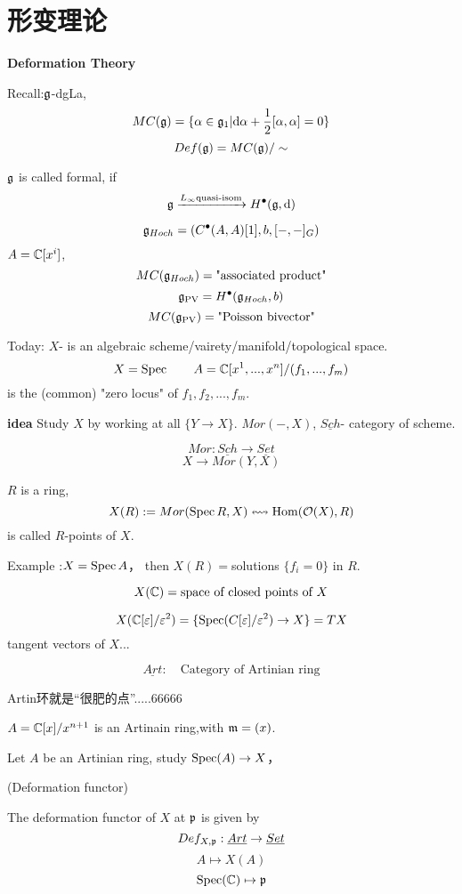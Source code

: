 \section{形变理论}
\textbf{Deformation Theory}

Recall:$\mathfrak{g}$-dgLa,
$$MC(\mathfrak{g})=\{\alpha\in\mathfrak{g}_1|\mathrm{d}\alpha+\frac{1}{2}[\alpha,\alpha]=0\}$$
$$Def(\mathfrak{g})=MC(\mathfrak{g})/\sim$$

$\mathfrak{g}$ is called formal, if 
$$\mathfrak{g}\xrightarrow{L_{\infty}\text{quasi-isom}}H^{\bullet}(\mathfrak{g},\mathrm{d})$$

$$\mathfrak{g}_{Hoch}=(C^{\bullet}(A,A)[1],b,[-,-]_G)$$
$A=\mathbb{C}[x^i]$,
$$MC(\mathfrak{g}_{Hoch})=\text{"associated product"}$$
$$\mathfrak{g}_{\operatorname{PV}}=H^{\bullet}(\mathfrak{g}_{Hoch},b)$$
$$MC(\mathfrak{g}_{\operatorname{PV}})=\text{"Poisson bivector"}$$

Today:
$X$- is an algebraic scheme/vairety/manifold/topological space.
$$X=\operatorname{Spec}\qquad A=\mathbb{C}[x^1,...,x^n]/(f_1,...,f_m)$$
is the (common) "zero locus" of $f_1,f_2,...,f_m$.

\textbf{idea} Study $X$ by working at all $\{Y\to X\}$.
$Mor(-,X)$, $\underline{Sch}$- category of scheme.

$$Mor: \underline{Sch}\to\underline{Set}$$
$$X\to Mor(Y,X)$$

\begin{notation}
$R$ is a ring, 
$$X(R):=Mor(\operatorname{Spec} R,X)\leftrightsquigarrow\operatorname{Hom}(\mathcal{O}(X),R)$$
is called $R$-points of $X$.
\end{notation}

Example :$X=\operatorname{Spec} A$， then $X(R)=$solutions $\{f_i=0\}$ in $R$.

\begin{example}
$$X(\mathbb{C})=\text{space of closed points of $X$}$$

$$X(\mathbb{C}[\varepsilon]/\varepsilon^2)=
\{\operatorname{Spec}(C[\varepsilon]/\varepsilon^2)\to X\}
=TX$$
tangent vectors of $X$...
\end{example}

\begin{notation}
$$\underline{Art}:\quad\text{Category of Artinian ring}$$
\end{notation}
Artin环就是“很肥的点”.....66666

\begin{example}
$A=\mathbb{C}[x]/x^{n+1}$ is an Artinain ring,with $\mathfrak{m}=(x)$.
\end{example}

Let $A$ be an Artinian ring, study $\operatorname{Spec}(A)\to X$，

\begin{definition}(Deformation functor)

The deformation functor of $X$ at $\mathfrak{p}$ is given by
$$Def_{X,\mathfrak{p}}:\underline{Art}\to\underline{Set}$$
$$A\mapsto X(A)$$
$$\operatorname{Spec}(\mathbb{C})\mapsto\mathfrak{p}$$
\end{definition}

